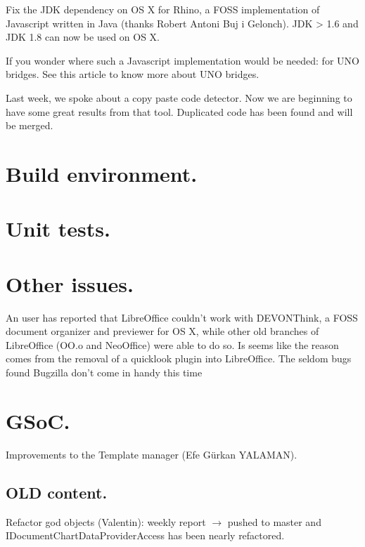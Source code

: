 \documentclass{article}
\begin{document}
Fix the JDK dependency on OS X for Rhino\cite{javaDepRhino1}\cite{javaDepRhino2}, a FOSS implementation of Javascript written in Java\cite{rhinoDefinition} (thanks Robert Antoni Buj i Gelonch). JDK > 1.6 and JDK 1.8 can now be used on OS X.

If you wonder where such a Javascript implementation would be needed: for UNO bridges. See this article to know more about UNO bridges\cite{unoBridges}.


Last week, we spoke about a copy paste code detector. Now we are beginning to have some great results from that tool. Duplicated code has been found and will be merged\cite{duplicateFound}.


\section{Build environment.}




\section{Unit tests.}




\section{Other issues.}

An user has reported that LibreOffice couldn't work with DEVONThink, a FOSS document organizer and previewer for OS X, while other old branches of LibreOffice (OO.o and NeoOffice) were able to do so. Is seems like the reason comes from the removal of a quicklook plugin into LibreOffice. The seldom bugs found Bugzilla don't come in handy this time\cite{quicklookPlugin}


\section{GSoC.}

Improvements to the Template manager (Efe Gürkan YALAMAN)\cite{gsocTemplateManager}.


\subsection{OLD content.}

Refactor god objects (Valentin): weekly report $\rightarrow$ pushed to master
and IDocumentChartDataProviderAccess has been nearly refactored.
\end{document}
